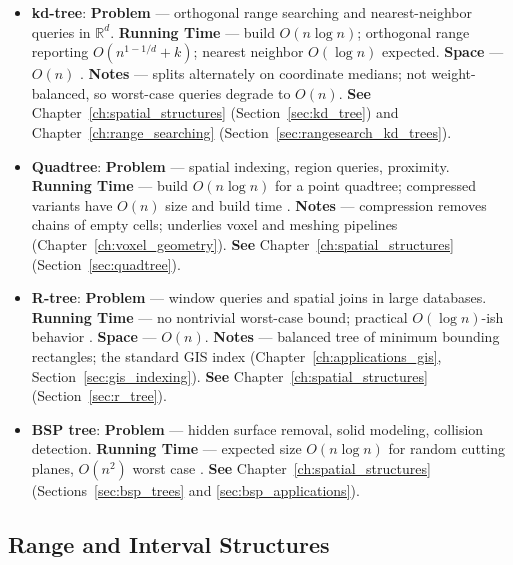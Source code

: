 \begin{itemize}
  \item \textbf{kd-tree}: \textbf{Problem} --- orthogonal
    range searching and nearest-neighbor queries in $\mathbb{R}^d$.
    \textbf{Running Time} --- build $O(n\log n)$; orthogonal range
    reporting $O(n^{1-1/d}+k)$; nearest neighbor $O(\log n)$ expected.
    \textbf{Space} --- $O(n)$ \cite{bentley1975, samet2006}.
    \textbf{Notes} --- splits alternately on coordinate medians; not
    weight-balanced, so worst-case queries degrade to $O(n)$. \textbf{See}
    Chapter~\ref{ch:spatial_structures} (Section~\ref{sec:kd_tree}) and
    Chapter~\ref{ch:range_searching} (Section~\ref{sec:rangesearch_kd_trees}).
  \item \textbf{Quadtree}: \textbf{Problem} --- spatial
    indexing, region queries, proximity. \textbf{Running Time} --- build
    $O(n\log n)$ for a point quadtree; compressed variants have $O(n)$
    size and build time \cite{finkel1974, samet2006}. \textbf{Notes} ---
    compression removes chains of empty cells; underlies voxel and meshing
    pipelines (Chapter~\ref{ch:voxel_geometry}). \textbf{See}
    Chapter~\ref{ch:spatial_structures} (Section~\ref{sec:quadtree}).
  \item \textbf{R-tree}: \textbf{Problem} --- window queries
    and spatial joins in large databases. \textbf{Running Time} --- no
    nontrivial worst-case bound; practical $O(\log n)$-ish behavior
    \cite{guttman1984, samet2006}. \textbf{Space} --- $O(n)$.
    \textbf{Notes} --- balanced tree of minimum bounding rectangles; the
    standard GIS index (Chapter~\ref{ch:applications_gis},
    Section~\ref{sec:gis_indexing}). \textbf{See}
    Chapter~\ref{ch:spatial_structures} (Section~\ref{sec:r_tree}).
  \item \textbf{BSP tree}: \textbf{Problem} --- hidden
    surface removal, solid modeling, collision detection.
    \textbf{Running Time} --- expected size $O(n\log n)$ for random
    cutting planes, $O(n^2)$ worst case \cite{fuchs1980, deberg2008}.
    \textbf{See} Chapter~\ref{ch:spatial_structures}
    (Sections~\ref{sec:bsp_trees} and \ref{sec:bsp_applications}).
\end{itemize}

\subsection{Range and Interval Structures}
\label{sec:appalgs_trees_interval}

